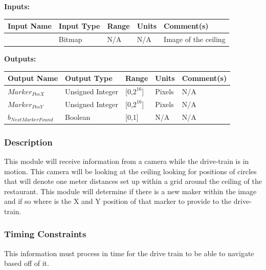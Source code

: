 \documentclass [10pt]{article}
\begin{document}
\textbf{Inputs: } \\

\begin{longtable}{|l|l|l|l|l|}\hline 
	\rowcolor{tableCell}\textbf{Input Name} & \textbf{Input Type} & \textbf{Range} & \textbf{Units} & \textbf{Comment(s)} \\ \hline
	 & Bitmap &  N/A & N/A & Image of the ceiling  \\ \hline
\end{longtable}

\textbf{Outputs: } \\

\begin{longtable}{|l|l|l|l|l|}\hline 
	\rowcolor{tableCell}\textbf{Output Name} & \textbf{Output Type} & \textbf{Range} & \textbf{Units} & \textbf{Comment(s)} \\ \hline
	$ Marker_{PosX} $ & Unsigned Integer & [0,$2^{16}$] & Pixels &  N/A\\ \hline
	\rowcolor{tableCell}$ Marker_{PosY} $ & Unsigned Integer & [0,$2^{16}$] & Pixels & N/A\\ \hline
	$ b_{NextMarkerFound} $ & Boolean & [0,1] & N/A & N/A\\ \hline
\end{longtable}


\subsubsection{Description}
This module will receive information from a camera while the drive-train is in motion. This camera will be looking at the ceiling looking for positions of circles that will denote one meter distances set up within a grid around the ceiling of the restaurant. This module will determine if there is a new maker within the image and if so where is the X and Y position of that marker to provide to the drive-train.


\subsubsection{Timing Constraints}
This information must process in time for the drive train to be able to navigate based off of it.
\end{document}
